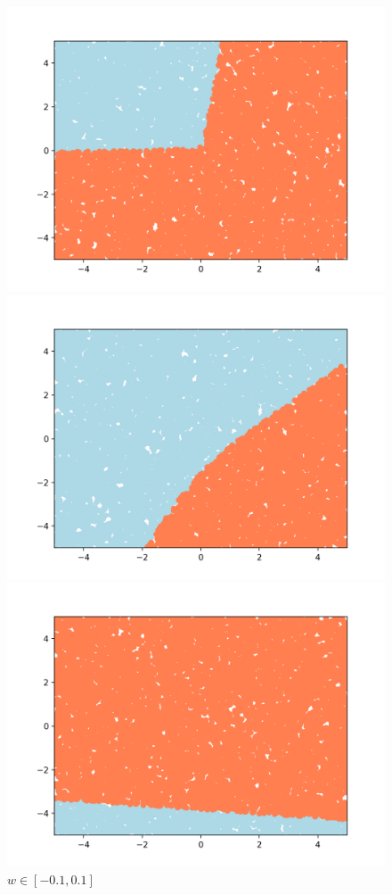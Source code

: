 \documentclass[12pt]{article}
\begin{document}
\begin{figure}[!htb]
  \includegraphics[width=\linewidth]{fig/fig_p23_1.png}
  \caption{$w \in [-10, 10]$}
\endminipage\hfill
{}
  \includegraphics[width=\linewidth]{fig/fig_p23_2.png}
  \caption{$w \in [-3, 3]$}
\endminipage\hfill
{}%
  \includegraphics[width=\linewidth]{fig/fig_p23_3.png}
  \caption{$w \in [-0.1, 0.1]$}
\endminipage
\end{figure}
\end{document}
